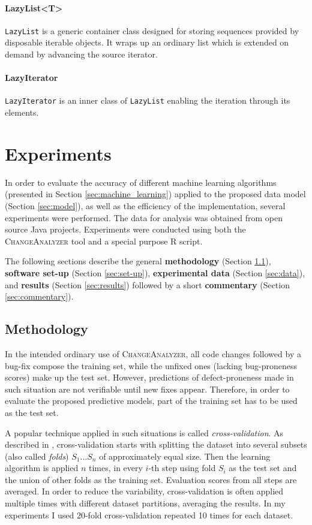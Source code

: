 \documentclass{pracamgr}
\newcommand{\ca}{\textsc{ChangeAnalyzer}\xspace}
\begin{document}
\subsubsection*{LazyList<T>}
\texttt{LazyList} is a generic container class designed for storing sequences provided by disposable iterable objects. It wraps up an ordinary list which is extended on demand by advancing the source iterator.

\subsubsection*{LazyIterator}
\texttt{LazyIterator} is an inner class of \texttt{LazyList} enabling the iteration through its elements.

\chapter{Experiments}
\label{cha:experiments}
In order to evaluate the accuracy of different machine learning algorithms (presented in Section \ref{sec:machine_learning}) applied to the proposed data model (Section \ref{sec:model}), as well as the efficiency of the implementation, several experiments were performed. The data for analysis was obtained from open source Java projects. Experiments were conducted using both the \ca tool and a special purpose R script.

The following sections describe the general \textbf{methodology} (Section \ref{sec:methodology}), \textbf{software set-up} (Section \ref{sec:set-up}), \textbf{experimental data} (Section \ref{sec:data}), and \textbf{results} (Section \ref{sec:results}) followed by a short \textbf{commentary} (Section \ref{sec:commentary}).

\section{Methodology}
\label{sec:methodology}
In the intended ordinary use of \ca, all code changes followed by a bug-fix compose the training set, while the unfixed ones (lacking bug-proneness scores) make up the test set. However, predictions of defect-proneness made in such situation are not verifiable until new fixes appear. Therefore, in order to evaluate the proposed predictive models, part of the training set has to be used as the test set.

A popular technique applied in such situations is called \emph{cross-validation}. As described in \cite[p. 249]{encyclopedia}, cross-validation starts with splitting the dataset into several subsets (also called \emph{folds}) $S_1 ... S_n$ of approximately equal size. Then the learning algorithm is applied $n$ times, in every $i$-th step using fold $S_i$ as the test set and the union of other folds as the training set. Evaluation scores from all steps are averaged. In order to reduce the variability, cross-validation is often applied multiple times with different dataset partitions, averaging the results. In my experiments I used 20-fold cross-validation repeated 10 times for each dataset.
\end{document}
